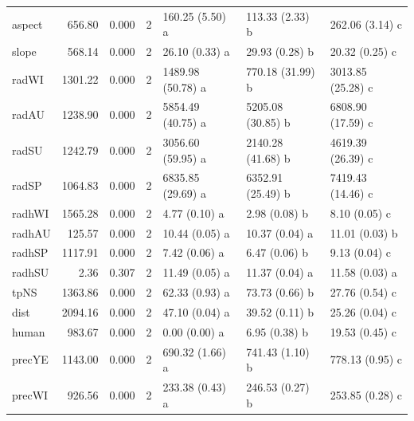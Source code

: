\begin{table}
\begin{tabular}{lrrllll}
\hspace{1em}aspect & 656.80 & 0.000 & 2 & 160.25 (5.50) a & 113.33 (2.33) b & 262.06 (3.14) c\\
\hspace{1em}slope & 568.14 & 0.000 & 2 & 26.10 (0.33) a & 29.93 (0.28) b & 20.32 (0.25) c\\
\hspace{1em}radWI & 1301.22 & 0.000 & 2 & 1489.98 (50.78) a & 770.18 (31.99) b & 3013.85 (25.28) c\\
\hspace{1em}radAU & 1238.90 & 0.000 & 2 & 5854.49 (40.75) a & 5205.08 (30.85) b & 6808.90 (17.59) c\\
\hspace{1em}radSU & 1242.79 & 0.000 & 2 & 3056.60 (59.95) a & 2140.28 (41.68) b & 4619.39 (26.39) c\\
\hspace{1em}radSP & 1064.83 & 0.000 & 2 & 6835.85 (29.69) a & 6352.91 (25.49) b & 7419.43 (14.46) c\\
\hspace{1em}radhWI & 1565.28 & 0.000 & 2 & 4.77 (0.10) a & 2.98 (0.08) b & 8.10 (0.05) c\\
\hspace{1em}radhAU & 125.57 & 0.000 & 2 & 10.44 (0.05) a & 10.37 (0.04) a & 11.01 (0.03) b\\
\hspace{1em}radhSP & 1117.91 & 0.000 & 2 & 7.42 (0.06) a & 6.47 (0.06) b & 9.13 (0.04) c\\
\hspace{1em}radhSU & 2.36 & 0.307 & 2 & 11.49 (0.05) a & 11.37 (0.04) a & 11.58 (0.03) a\\
\hspace{1em}tpNS & 1363.86 & 0.000 & 2 & 62.33 (0.93) a & 73.73 (0.66) b & 27.76 (0.54) c\\
\hspace{1em}dist & 2094.16 & 0.000 & 2 & 47.10 (0.04) a & 39.52 (0.11) b & 25.26 (0.04) c\\
\hspace{1em}human & 983.67 & 0.000 & 2 & 0.00 (0.00) a & 6.95 (0.38) b & 19.53 (0.45) c\\
\hspace{1em}precYE & 1143.00 & 0.000 & 2 & 690.32 (1.66) a & 741.43 (1.10) b & 778.13 (0.95) c\\
\hspace{1em}precWI & 926.56 & 0.000 & 2 & 233.38 (0.43) a & 246.53 (0.27) b & 253.85 (0.28) c\\

\end{tabular}
\end{table}
